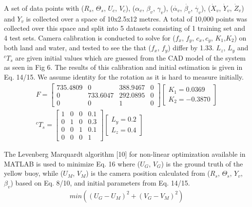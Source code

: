 \documentclass[a4paper]{IEEEtran}
\let\Theta\varTheta
\newcommand{\RSonar}{$\si{\textit{R}_{s}}$\xspace}
\newcommand{\ThetaSonar}{$\si{\Theta_{s}}$\xspace}
\newcommand{\UCamera}{$\si{\textit{U}_{c}}$\xspace}
\newcommand{\VCamera}{$\si{\textit{V}_{c}}$\xspace}
\newcommand{\YVehicle}{$\si{\textit{Y}_{v}}$\xspace}
\newcommand{\RollVehicle}{${\alpha_{v}}$\xspace}
\newcommand{\PitchVehicle}{${\beta_{v}}$\xspace}
\newcommand{\YawVehicle}{${\gamma_{v}}$\xspace}
\newcommand{\RollVehicleVelocity}{${\dot{\alpha_{v}}}$\xspace}
\newcommand{\PitchVehicleVelocity}{${\dot{\beta_{v}}}$\xspace}
\newcommand{\YawVehicleVelocity}{${\dot{\gamma_{v}}}$\xspace}
\newcommand{\XVehicleVelocity}{$\si{\dot{\textit{X}}_{v}}$\xspace}
\newcommand{\YVehicleVelocity}{$\si{\dot{\textit{Y}}_{v}}$\xspace}
\newcommand{\ZVehicleVelocity}{$\si{\dot{\textit{Z}}_{v}}$\xspace}
\begin{document}
A set of data points with (\RSonar, \ThetaSonar, \UCamera, \VCamera), (\RollVehicle, \PitchVehicle, \YawVehicle), (\RollVehicleVelocity, \PitchVehicleVelocity, \YawVehicleVelocity), (\XVehicleVelocity, \YVehicleVelocity, \ZVehicleVelocity) and \YVehicle is collected over a space of 10x2.5x12 metres. A total of 10,000 points was collected over this space and split into 5 datasets consisting of 1 training set and 4 test sets. Camera calibration is conducted to solve for ($f_{x}$, $f_{y}$, $c_{x}, c_{y}$, $K_{1}$,$K_{2}$) on both land and water, and tested to see the that ($f_{x}$, $f_{y}$) differ by 1.33. $L_{z}$, $L_{y}$ and $^{c}T_{s}$ are given initial values which are guessed from the CAD model of the system as seen in Fig 6. The results of this calibration and initial estimation is given in Eq. 14/15. We assume identity for the rotation as it is hard to measure initially.
\begingroup\makeatletter\def\f@size{7}\check@mathfonts
\begin{gather}
F=\left[\begin{array}{cccc}
735.4809 & 0 & 388.9467 & 0\\
0 & 733.6047 & 292.0895 & 0\\
0 & 0 & 1 & 0
\end{array}\right]
 \left[\begin{array}{c}
K_{1}=0.0369\\
K_{2}=-0.3870
\end{array}\right] \\
^{c}T_{s}=\left[\begin{array}{cccc}
1 & 0 & 0 & 0.1\\
0 & 1 & 0 & 0.3\\
0 & 0 & 1 & 0.1\\
0 & 0 & 0 & 1
\end{array}\right]
 \left[\begin{array}{c}
L_{y}=0.2\\
L_{z}=0.4
\end{array}\right]
\end{gather}
\endgroup

The Levenberg Marquardt algorithm [10] for non-linear optimization available in MATLAB is used to minimize Eq. 16 where ($U_{G}$, $V_{G}$) is the ground truth of the yellow buoy, while ($U_{M}$, $V_{M}$) is the camera position calculated from (\RSonar, \ThetaSonar, \YVehicle, \PitchVehicle) based on Eq. 8/10, and initial parameters from Eq. 14/15.
\begingroup\makeatletter\def\f@size{7}\check@mathfonts
\begin{gather}
min(\left(U_{G}-U_{M}\right)^{2}+\left(V_{G}-V_{M}\right)^{2})
\end{gather}
\endgroup
\end{document}
